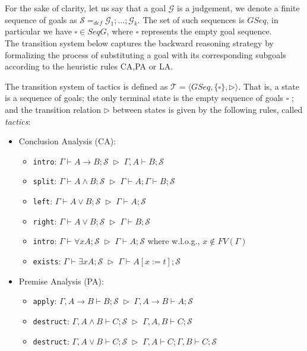 \documentclass[a4paper,UKenglish]{lipics}
\newcommand{\G}{\Gamma}
\newcommand{\Ge}{\mathcal{G}}
\newcommand{\Sc}{\mathcal{S}}
\begin{document}
For the sake of clarity, let us say that a goal $\Ge$ is a judgement, we denote a finite sequence of goals as $\Sc=_{def}\Ge_1;\ldots;\Ge_k$. The set of such sequences is $GSeq$, in particular we have $\square\in SeqG$, where $\square$ represents the empty goal sequence. \\

The transition system below captures the backward reasoning strategy by formalizing the process of substituting a goal with its corresponding subgoals according to the heuristic rules CA,PA or LA.

\begin{definition}\label{def:tact}
The transition system of tactics is defined as $\mathcal{T}=\langle GSeq, \{\square\},\rhd\rangle$. That is, a state is a sequence of goals; the only terminal state is the empty sequence of goals $\square$ ; and the transition relation $\rhd$ between states is given by the following rules, called {\em tactics}:
\begin{itemize}
\item Conclusion Analysis (CA):
  \begin{itemize}
		\item {\tt intro}: $\G\vdash A\to B;\Sc\;\rhd\; \G,A\vdash B;\Sc$
		\vspace{0.2cm}
		\item {\tt split}: $\G\vdash A\land B;\Sc\;\rhd\; \G\vdash A; \G\vdash B;\Sc$
		\vspace{0.2cm}
		\item {\tt left}: $\G\vdash A\lor B;\Sc\;\rhd\; \G\vdash A;\Sc$
		\vspace{0.2cm}
		\item {\tt right}: $\G\vdash A\lor B;\Sc\;\rhd\; \G\vdash B;\Sc$
		\vspace{0.2cm} 
              \item {\tt intro}: $\G\vdash \forall x A;\Sc\;\rhd\;\G\vdash A;\Sc$ where  
w.l.o.g., $x\notin FV(\G)$
	\vspace{0.2cm}
	\item {\tt exists}: $\G\vdash \exists x A;\Sc\;\rhd\;\G\vdash A[x:=t];\Sc$ 
\end{itemize}
	\vspace{0.2cm}
\item Premise Analysis (PA):
\begin{itemize}
	\item {\tt apply}: $\G,A\to B\vdash B;\Sc\;\rhd\; \G,A\to B\vdash A;\Sc$
\vspace{0.2cm}
	\item {\tt destruct}: $\G,A\land B\vdash C;\Sc\;\rhd\; \G,A,B\vdash C;\Sc$
	\vspace{0.2cm}
	\item {\tt destruct}: $\G,A\lor B\vdash C;\Sc\;\rhd\; \G,A\vdash C;\G,B\vdash C;\Sc$


\end{itemize}
\end{itemize}
\end{definition}
\end{document}
